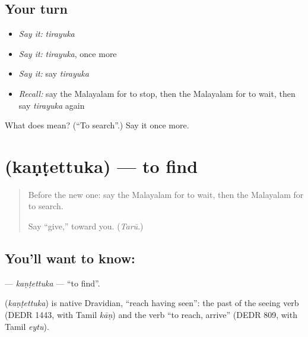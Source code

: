 \subsection*{Your turn}
\begin{itemize}
\raggedright
  \item \emph{Say it:} \emph{tirayuka}
  \item \emph{Say it:} \emph{tirayuka}, once more
  \item \emph{Say it:} say \emph{tirayuka}
  \item \emph{Recall:} say the Malayalam for to stop, then the Malayalam for to wait, then say \emph{tirayuka} again
\end{itemize}

\begin{tcolorbox}[breakable,colback=teal!4,colframe=teal!35!black,title={Before you move on}]
What does  mean? (\textquotedblleft{}To search\textquotedblright{}.) Say it once more.
\end{tcolorbox}
\section[\texorpdfstring{\ml{കണ്ടെത്തുക} (kaṇṭettuka)}{കണ്ടെത്തുക (kaṇṭettuka)}]{ (kaṇṭettuka) — to find}

\label{lesson:ML-C174-kantettuka}



\begin{quote}
Before the new one: say the Malayalam for to wait, then the Malayalam for to search.

Say \textquotedblleft{}give,\textquotedblright{} toward you. (\emph{Tarū}.)
\end{quote}

\subsection*{You'll want to know: }
\textbf{} — \emph{kaṇṭettuka} — \textquotedblleft{}to find\textquotedblright{}.

\begin{cousinweb}
\textbf{} (\emph{kaṇṭettuka}) is native Dravidian, \textquotedblleft{}reach having seen\textquotedblright{}: the past of the seeing verb (DEDR 1443, with Tamil \emph{kāṇ}) and the verb \textquotedblleft{}to reach, arrive\textquotedblright{} (DEDR 809, with Tamil \emph{eytu}).
\end{cousinweb}

